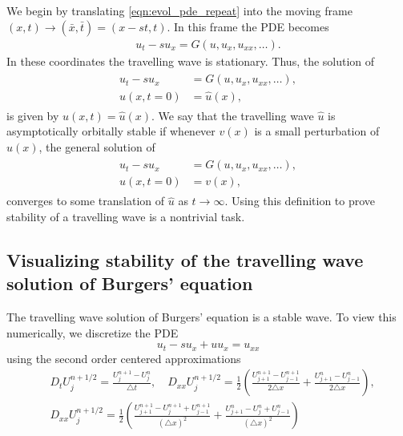 We begin by translating \eqref{eqn:evol_pde_repeat} into the moving frame $(x,t) \to (\bar{x},\bar{t}) = (x-st, t)$.
In this frame the PDE becomes
\begin{align*}
u_t - su_x = G(u,u_x, u_{xx}, \ldots).
\end{align*}
In these coordinates the travelling wave is stationary.
Thus, the solution of
\begin{align*}
\begin{split}
u_t - su_x &= G(u,u_x, u_{xx}, \ldots), \\
u(x,t = 0) &= \hat{u}(x),
\end{split}
\end{align*}
is given by $u(x,t) = \hat{u}(x)$.
We say that the travelling wave $\hat{u}$ is asymptotically orbitally stable if whenever $v(x)$ is a small perturbation of $\hat{u}(x)$, the general solution of
\begin{align*}
\begin{split}
u_t - su_x &= G(u,u_x, u_{xx}, \ldots), \\
u(x,t = 0) &= v(x),
\end{split}
\end{align*}
converges to some translation of $\hat{u}$ as $t \to \infty$.
Using this definition to prove stability of a travelling wave is a nontrivial task.

\subsection*{Visualizing stability of the travelling wave solution of Burgers' equation}
The travelling wave solution of Burgers' equation is a stable wave.
To view this numerically, we discretize the PDE
\[u_t -su_x + uu_x = u_{xx}\]
using the second order centered approximations
\begin{align*}
&{ } D_t U_j^{n+1/2} = \frac{U_j^{n+1}-U_j^n}{\triangle t}, \quad
D_{xx}U_j^{n+1/2} = \frac{1}{2} \left( \frac{U_{j+1}^{n+1}-U_{j-1}^{n+1}}{2 \triangle x} +  \frac{U_{j+1}^{n}-U_{j-1}^{n}}{2 \triangle x}\right),\\
&{ } D_{xx}U_j^{n+1/2} = \frac{1}{2} \left( \frac{U_{j+1}^{n+1}- U_{j}^{n+1}+U_{j-1}^{n+1}}{(\triangle x)^2} + \frac{U_{j+1}^{n}- U_{j}^{n}+U_{j-1}^{n}}{(\triangle x)^2}\right)
\end{align*}

